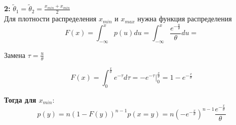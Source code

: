 \textbf{2:} 
$\tilde\theta_1 = \tilde\theta_2 = \frac{x_{min} + x_{min}}{2}$ \\
Для плотности распределения $x_{min}$ и $x_{max}$ нужна функция распределения\\
\begin{equation*}
    F(x) = \int_{-\infty}^{x}p(u)du
    = \int_{-\infty}^{x}\frac{e^{-\frac{u}{\theta}}}{\theta}du =
\end{equation*}
\begin{center}
    Замена $\tau = \frac{u}{\theta}$
\end{center}
\begin{equation*}
    F(x) = \int_{0}^{\frac{x}{\theta}}e^{-\tau}d\tau
    = -e^{-\tau}\bigg|_{0}^{\frac{x}{\theta}} 
    = 1 - e^{-\frac{x}{\theta}}
\end{equation*}
\vspace{2.5mm}

\textbf{Тогда для $x_{min}:$}\\
\begin{equation*}
    p(y) = n(1- F(y))^{n-1}p(x=y)
    = n(-e^{-\frac{x}{\theta}})^{n-1}\frac{e^{-\frac{x}{\theta}}}{\theta}
\end{equation*}
